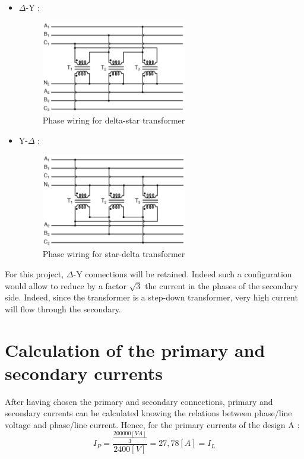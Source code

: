\documentclass[12pt,a4paper]{report}
\begin{document}
\begin{itemize}
    \item $\Delta$-Y :
       
    \begin{figure}[h]
    \centering
    \includegraphics[width=0.6\textwidth]{delta-y.PNG}
    \caption{Phase wiring for delta-star transformer}
    \label{fig:delta-star transformer}
    \end{figure}
    
    \item Y-$\Delta$ :
       
    \begin{figure}[h]
    \centering
    \includegraphics[width=0.6\textwidth]{y-delta.PNG}
    \caption{Phase wiring for star-delta transformer}
    \label{fig:star-delta transformer}
    \end{figure}
\end{itemize}

For this project, $\Delta$-Y connections will be retained. Indeed such a configuration would allow to reduce by a factor $\sqrt{3}$ the current in the phases of the secondary side. Indeed, since the transformer is a step-down transformer, very high current will flow through the secondary.

\section{Calculation of the primary and secondary currents}
After having chosen the primary and secondary connections, primary and secondary currents can be calculated knowing the relations between phase/line voltage and phase/line current. Hence, for the primary currents of the design A :
\begin{equation}
    I_P = \frac{\frac{200000 [VA]}{3}}{2400[V]} = 27,78 [A] = I_L
\end{equation}
\end{document}
